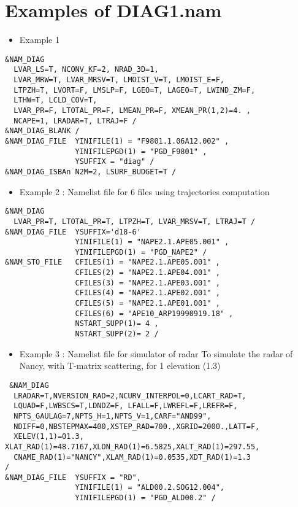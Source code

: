 \section{Examples of DIAG1.nam } \label{ss:diag_ex}
\begin{itemize}
\item Example 1 
\end{itemize}

\begin{verbatim}
&NAM_DIAG 
  LVAR_LS=T, NCONV_KF=2, NRAD_3D=1, 
  LVAR_MRW=T, LVAR_MRSV=T, LMOIST_V=T, LMOIST_E=F,
  LTPZH=T, LVORT=F, LMSLP=F, LGEO=T, LAGEO=T, LWIND_ZM=F,
  LTHW=T, LCLD_COV=T, 
  LVAR_PR=F, LTOTAL_PR=F, LMEAN_PR=F, XMEAN_PR(1,2)=4. ,
  NCAPE=1, LRADAR=T, LTRAJ=F /
&NAM_DIAG_BLANK /
&NAM_DIAG_FILE  YINIFILE(1) = "F9801.1.06A12.002" ,
                YINIFILEPGD(1) = "PGD_F9801" ,
                YSUFFIX = "diag" /
&NAM_DIAG_ISBAn N2M=2, LSURF_BUDGET=T /
\end{verbatim}

\begin{itemize}
\item Example 2 : Namelist file for 6 files using trajectories computation
\end{itemize}

\begin{verbatim}
&NAM_DIAG 
  LVAR_PR=T, LTOTAL_PR=T, LTPZH=T, LVAR_MRSV=T, LTRAJ=T /
&NAM_DIAG_FILE  YSUFFIX='d18-6'
                YINIFILE(1) = "NAPE2.1.APE05.001" ,
                YINIFILEPGD(1) = "PGD_NAPE2" /
&NAM_STO_FILE   CFILES(1) = "NAPE2.1.APE05.001" ,
                CFILES(2) = "NAPE2.1.APE04.001" ,
                CFILES(3) = "NAPE2.1.APE03.001" ,
                CFILES(4) = "NAPE2.1.APE02.001" ,
                CFILES(5) = "NAPE2.1.APE01.001" ,
                CFILES(6) = "APE10_ARP19990919.18" ,
                NSTART_SUPP(1)= 4 , 
                NSTART_SUPP(2)= 2 /
\end{verbatim}
\newpage
\begin{itemize}
\item Example 3 : Namelist file for simulator of radar To simulate the radar of Nancy, with T-matrix scattering, for 1 elevation (1.3)
\end{itemize}

\begin{verbatim}
 &NAM_DIAG
  LRADAR=T,NVERSION_RAD=2,NCURV_INTERPOL=0,LCART_RAD=T,
  LQUAD=F,LWBSCS=T,LDNDZ=F, LFALL=F,LWREFL=F,LREFR=F,
  NPTS_GAULAG=7,NPTS_H=1,NPTS_V=1,CARF="AND99",
  NDIFF=0,NBSTEPMAX=400,XSTEP_RAD=700.,XGRID=2000.,LATT=F,
  XELEV(1,1)=01.3, XLAT_RAD(1)=48.7167,XLON_RAD(1)=6.5825,XALT_RAD(1)=297.55,
  CNAME_RAD(1)="NANCY",XLAM_RAD(1)=0.0535,XDT_RAD(1)=1.3
/
&NAM_DIAG_FILE  YSUFFIX = "RD",
                YINIFILE(1) = "ALD00.2.SOG12.004",
                YINIFILEPGD(1) = "PGD_ALD00.2" /
\end{verbatim}


